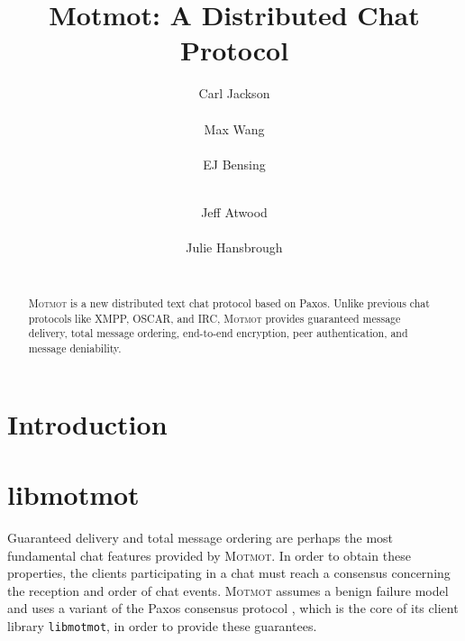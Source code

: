 \documentclass{sig-alternate}
\newcommand\Motmot{\textsc{Motmot}\xspace}
\newcommand\libmotmot{\texttt{libmotmot}\xspace}
\begin{document}

\title{Motmot: A Distributed Chat Protocol}

%
\author{
  \alignauthor
  Carl Jackson \\
     \\
  \alignauthor
  Max Wang \\
     \\
  \alignauthor
  EJ Bensing \\
     \\
  \and
  \alignauthor
  Jeff Atwood \\
     \\
  \alignauthor
  Julie Hansbrough \\
     \\
}

\maketitle

\begin{abstract}

\Motmot is a new distributed text chat protocol based on Paxos. Unlike previous
chat protocols like XMPP, OSCAR, and IRC, \Motmot provides guaranteed message
delivery, total message ordering, end-to-end encryption, peer authentication,
and message deniability.

\end{abstract}

\section{Introduction}

\section{libmotmot}

Guaranteed delivery and total message ordering are perhaps the most fundamental
chat features provided by \Motmot.  In order to obtain these properties, the
clients participating in a chat must reach a consensus concerning the reception
and order of chat events.  \Motmot assumes a benign failure model and uses a
variant of the Paxos consensus protocol \cite{paxos,paxsimp}, which is the core
of its client library \libmotmot, in order to provide these guarantees.
\end{document}
